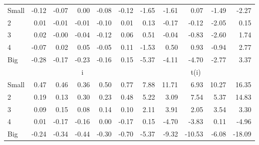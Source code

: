\begin{table}[!ht]
\begin{tabular}{lrrrrrrrrrr}
    \\
      \cmidrule(r){2-6} \cmidrule(r){7-11}

    Small   & -0.12  & -0.07  & 0.00  & -0.08  & -0.12  & -1.65  & -1.61  & 0.07  & -1.49  & -2.27  \\
         2  & 0.01  & -0.01  & -0.01  & -0.10  & 0.01  & 0.13  & -0.17  & -0.12  & -2.05  & 0.15  \\
         3  & 0.02  & -0.00  & -0.04  & -0.12  & 0.06  & 0.51  & -0.04  & -0.83  & -2.60  & 1.74  \\
         4  & -0.07  & 0.02  & 0.05  & -0.05  & 0.11  & -1.53  & 0.50  & 0.93  & -0.94  & 2.77  \\
    Big     & -0.28  & -0.17  & -0.23  & -0.16  & 0.15  & -5.37  & -4.11  & -4.70  & -2.77  & 3.37  \\

  
    
      & \multicolumn{5}{c}{i} & \multicolumn{5}{c}{t(i)}
    
    \\
      \cmidrule(r){2-6} \cmidrule(r){7-11}

    Small   & 0.47  & 0.46  & 0.36  & 0.50  & 0.77  & 7.88  & 11.71  & 6.93  & 10.27  & 16.35  \\
         2  & 0.19  & 0.13  & 0.30  & 0.23  & 0.48  & 5.22  & 3.09  & 7.54  & 5.37  & 14.83  \\
         3  & 0.09  & 0.15  & 0.08  & 0.14  & 0.10  & 2.11  & 3.91  & 2.05  & 3.54  & 3.30  \\
         4  & 0.01  & -0.17  & -0.16  & 0.00  & -0.17  & 0.15  & -4.70  & -3.83  & 0.11  & -4.96  \\
    Big     & -0.24  & -0.34  & -0.44  & -0.30  & -0.70  & -5.37  & -9.32  & -10.53  & -6.08  & -18.09  \\

  

  \bottomrule
\end{tabular}
\label{tbl:25_Size_BM_FF2016}
\end{table}